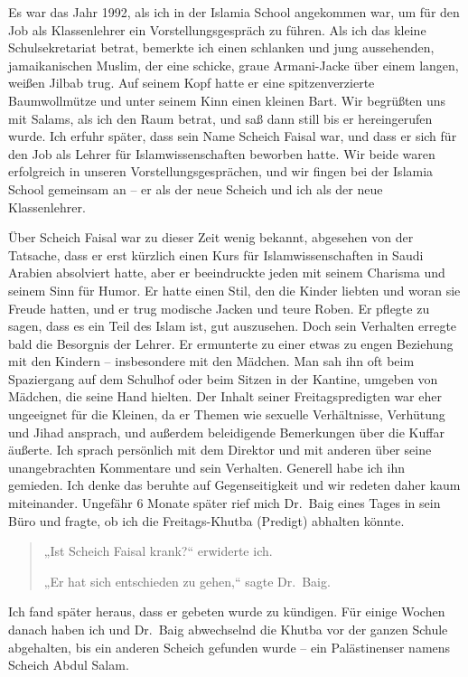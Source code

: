 \documentclass[12pt]{memoir}
\def\–{\hskip0pt-\hskip0pt}
\begin{document}
Es war das Jahr 1992, als ich in der Islamia School angekommen war,
um für den Job als Klassenlehrer ein Vorstellungsgespräch zu führen.
Als ich das kleine Schulsekretariat betrat,
bemerkte ich einen schlanken und jung aussehenden, jamaikanischen Muslim,
der eine schicke, graue Armani\–Jacke
über einem langen, weißen Jilbab trug.
Auf seinem Kopf hatte er eine spitzenverzierte Baumwollmütze
und unter seinem Kinn einen kleinen Bart.
Wir begrüßten uns mit Salams, als ich den Raum betrat,
und saß dann still bis er hereingerufen wurde.
Ich erfuhr später, dass sein Name Scheich Faisal war,
und dass er sich für den Job
als Lehrer für Islamwissenschaften beworben hatte.
Wir beide waren erfolgreich in unseren Vorstellungsgesprächen,
und wir fingen bei der Islamia School gemeinsam an –
er als der neue Scheich und ich als der neue Klassenlehrer.

Über Scheich Faisal war zu dieser Zeit wenig bekannt,
abgesehen von der Tatsache, dass er erst kürzlich einen Kurs
für Islamwissenschaften in Saudi Arabien absolviert hatte,
aber er beeindruckte jeden mit seinem Charisma und seinem Sinn für Humor.
Er hatte einen Stil, den die Kinder liebten und woran sie Freude hatten,
und er trug modische Jacken und teure Roben.
Er pflegte zu sagen, dass es ein Teil des Islam ist, gut auszusehen.
Doch sein Verhalten erregte bald die Besorgnis der Lehrer.
Er ermunterte zu einer etwas zu engen Beziehung mit den Kindern –
insbesondere mit den Mädchen.
Man sah ihn oft beim Spaziergang auf dem Schulhof
oder beim Sitzen in der Kantine,
umgeben von Mädchen, die seine Hand hielten.
Der Inhalt seiner Freitagspredigten war eher ungeeignet für die Kleinen,
da er Themen wie sexuelle Verhältnisse, Verhütung und Jihad ansprach,
und außerdem beleidigende Bemerkungen über die Kuffar äußerte.
Ich sprach persönlich mit dem Direktor und mit anderen
über seine unangebrachten Kommentare und sein Verhalten.
Generell habe ich ihn gemieden.
Ich denke das beruhte auf Gegenseitigkeit
und wir redeten daher kaum miteinander.
Ungefähr 6 Monate später rief mich Dr.\ Baig eines Tages in sein Büro
und fragte, ob ich die Freitags\–Khutba (Predigt) abhalten könnte.

\begin{quote}
„Ist Scheich Faisal krank?“ erwiderte ich.

„Er hat sich entschieden zu gehen,“ sagte Dr.\ Baig.
\end{quote}

Ich fand später heraus, dass er gebeten wurde zu kündigen.
Für einige Wochen danach
haben ich und Dr.\ Baig abwechselnd
die Khutba vor der ganzen Schule abgehalten,
bis ein anderen Scheich gefunden wurde –
ein Palästinenser namens Scheich Abdul Salam.
\end{document}
